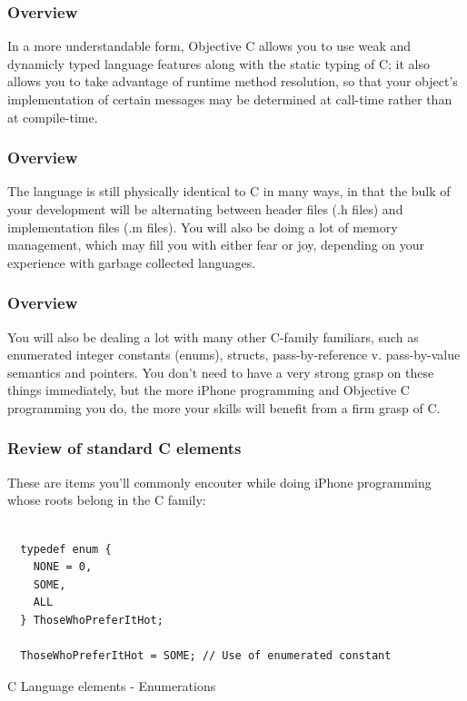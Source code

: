 \documentclass[10pt]{beamer}
\begin{document}
\begin{frame}[fragile]
  \frametitle{Overview}
  In a more understandable form, Objective C allows you to use weak and dynamicly typed language features along with the static typing of C; it also allows you to take advantage of runtime method resolution, so that your object's implementation of certain messages may be determined at call-time rather than at compile-time.

\end{frame}

\begin{frame}[fragile]
  \frametitle{Overview}
  The language is still physically identical to C in many ways, in that the bulk of your development will be alternating between header files (.h files) and implementation files (.m files). You will also be doing a lot of memory management, which may fill you with either fear or joy, depending on your experience with garbage collected languages.

\end{frame}

\begin{frame}[fragile]
  \frametitle{Overview}
  You will also be dealing a lot with many other C-family familiars, such as enumerated integer constants (enums), structs, pass-by-reference v. pass-by-value semantics and pointers.  You don't need to have a very strong grasp on these things immediately, but the more iPhone programming and Objective C programming you do, the more your skills will benefit from a firm grasp of C.

\end{frame}

    
\begin{frame}[fragile]
  \frametitle{Review of standard C elements}
  These are items you'll commonly encouter while doing iPhone programming whose roots belong in the C family: \begin{listing}[H]
    \begin{verbatim}

  typedef enum {
    NONE = 0,
    SOME,
    ALL
  } ThoseWhoPreferItHot;

  ThoseWhoPreferItHot = SOME; // Use of enumerated constant

  \end{verbatim}
    \caption{C Language elements - Enumerations}
    \label{listing:1}
  \end{listing}

\end{frame}
\end{document}

